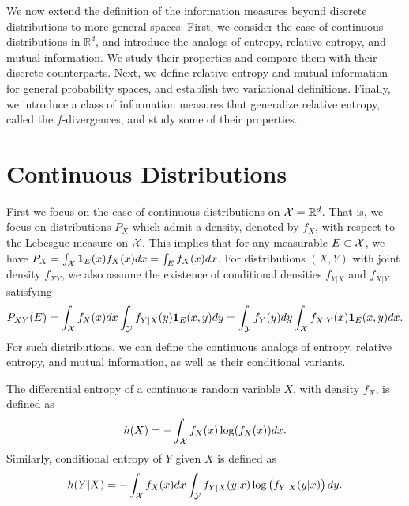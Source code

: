     We now extend the definition of the information measures beyond discrete distributions to more general spaces. First, we consider the case of continuous distributions in $\mathbb{R}^d$, and introduce the analogs of entropy, relative entropy, and mutual information. We study their properties and compare them with their discrete counterparts. Next, we define relative entropy and mutual information for general probability spaces, and establish two variational definitions. Finally, we introduce a class of information measures that generalize relative entropy, called the $f$-divergences, and study some of their properties. 

 
    \section{Continuous Distributions}
        First we focus on the case of continuous distributions on $\mathcal{X} =\mathbb{R}^d$. That is, we focus on distributions $P_X$ which admit a density, denoted by $f_X$, with respect to the Lebesgue measure on $\mathcal{X}$. This implies that for any measurable $E \subset \mathcal{X}$, we have $P_X = \int_{\mathcal{X}} \boldsymbol{1}_E(x) f_X(x) dx  = \int_{E} f_X(x) dx$. For distributions $(X, Y)$ with joint density $f_{XY}$, we also assume the existence of conditional densities $f_{Y|X}$ and $f_{X|Y}$ satisfying 
        \begin{align}
            P_{XY}(E) = \int_{\mathcal{X}}f_X(x)dx \int_{\mathcal{Y}} f_{Y|X}(y) \boldsymbol{1}_E(x,y)dy = \int_{\mathcal{Y}}f_Y(y)dy \int_{\mathcal{X}} f_{X|Y}(x) \boldsymbol{1}_E(x,y)dx.  
        \end{align}
        For such distributions, we can define the continuous analogs of entropy, relative entropy, and mutual information, as well as their conditional variants. 

        \begin{definition}
            \label{def:diff-entropy}
            The differential entropy of a continuous random variable $X$, with density $f_X$, is defined as 
            \begin{align}
                h(X) = -\int_{\mathcal{X}} f_X(x) \log(f_X(x)) dx. 
            \end{align}
            Similarly, conditional entropy of $Y$ given $X$ is defined as 
            \begin{align}
                h(Y|X) = -\int_{\mathcal{X}}f_X(x) dx \int_{\mathcal{Y}}  f_{Y|X}(y|x) \log \left( f_{Y|X}(y|x) \right) dy. 
            \end{align}
        \end{definition}

